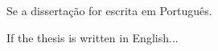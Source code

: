 
\begin{agradecimentos}
    Se a dissertação for escrita em Português.
\end{agradecimentos}

\begin{acknowledgements}
    If the thesis is written in English...
\end{acknowledgements}
